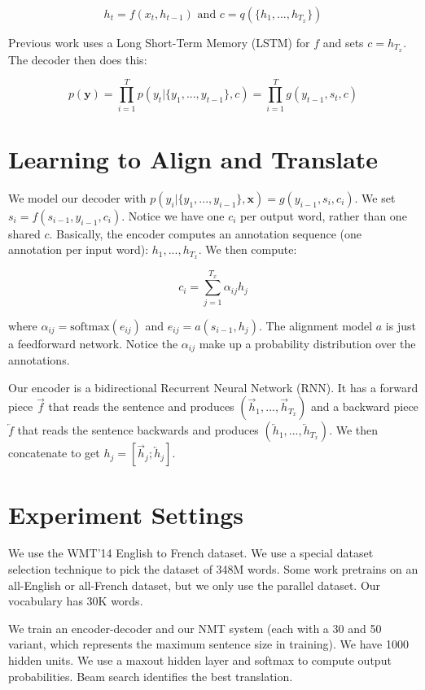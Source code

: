\documentclass[a4paper]{article}
\begin{document}
$$
h_t = f(x_t, h_{t-1}) \text{ and } c = q(\{h_1, ..., h_{T_x}\})
$$

Previous work uses a Long Short-Term Memory (LSTM) for $f$ and sets
$c = h_{T_x}$. The decoder then does this:

$$
p(\mathbf{y}) = \prod_{i=1}^{T}{p(y_t | \{y_1, ..., y_{t-1}\}, c)}
= \prod_{i=1}^{T}{g(y_{t-1}, s_t, c)}
$$

\section{Learning to Align and Translate}
We model our decoder with $p(y_i | \{y_1, ..., y_{i-1}\}, \mathbf{x}) =
g(y_{i-1}, s_i, c_i)$. We set $s_i = f(s_{i-1}, y_{i-1}, c_i)$. Notice we
have one $c_i$ per output word, rather than one shared $c$. Basically, the
encoder computes an annotation sequence (one annotation per input word):
$h_1, ..., h_{T_x}$. We then compute:

$$
c_i = \sum_{j=1}^{T_x}{\alpha_{ij} h_j}
$$

where $\alpha_{ij} = \text{softmax}(e_{ij})$ and $e_{ij} = a(s_{i-1}, h_j)$. The
alignment model $a$ is just a feedforward network. Notice the $\alpha_{ij}$
make up a probability distribution over the annotations.

Our encoder is a bidirectional Recurrent Neural Network (RNN). It has a forward
piece $\overrightarrow{f}$ that reads the sentence and produces
$(\overrightarrow{h}_1, ..., \overrightarrow{h}_{T_x})$ and a backward piece
$\overleftarrow{f}$ that reads the sentence backwards and produces
$(\overleftarrow{h}_1, ..., \overleftarrow{h}_{T_x})$. We then concatenate to
get $h_j = [\overrightarrow{h}_j; \overleftarrow{h}_j]$.

\section{Experiment Settings}
We use the WMT'14 English to French dataset. We use a special dataset selection
technique to pick the dataset of 348M words. Some work pretrains on an
all-English or all-French dataset, but we only use the parallel dataset. Our
vocabulary has 30K words.

We train an encoder-decoder and our NMT system (each with a 30 and 50 variant,
which represents the maximum sentence size in training). We have 1000 hidden
units. We use a maxout hidden layer and softmax to compute output probabilities.
Beam search identifies the best translation.
\end{document}
